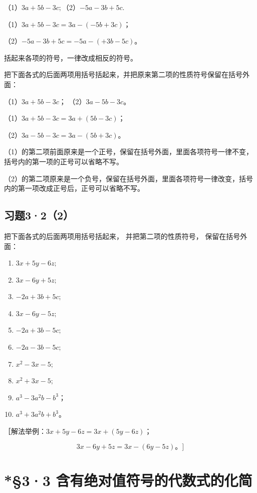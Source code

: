 （1）\(3a + 5b - 3c;\)（2）\(-5a - 3b + 5c.\)

 （1）\(3a + 5b - 3c = 3a - (-5b + 3c)\)；

（2）\(-5a - 3b + 5c = -5a - (+3b - 5c)\)。

 括起来各项的符号，一律改成相反的符号。

把下面各式的后面两项用括号括起来，并把原来第二项的性质符号保留在括号外面：

（1）\(3a + 5b - 3c\)； （2）\(3a - 5b - 3c\)。

 （1）\(3a + 5b - 3c = 3a + (5b - 3c)\)；

（2）\(3a - 5b - 3c = 3a - (5b + 3c)\)。

（1）的第二项前面原来是一个正号，保留在括号外面，里面各项符号一律不变，括号内的第一项的正号可以省略不写。

（2）的第二项原来是一个负号，保留在括号外面，里面各项符号一律改变，括号内的第一项改成正号后，正号可以省略不写。

\subsection{习题3·2（2）}

把下面各式的后面两项用括号括起来， 并把第二项的性质符号，
保留在括号外面：

\begin{enumerate}[start=1]
\item
  \(3x + 5y - 6z;\)
\item
  \(3x - 6y + 5z;\)
\item
  \(-2a + 3b + 5c;\)
\item
  \(3x - 6y - 5z;\)
\item
  \(-2a + 3b - 5c;\)
\item
  \(-2a - 3b - 5c;\)
\item
  \(x^{2} - 3x - 5;\)
\item
  \(x^{2} + 3x - 5;\)
\item
  \(a^3 - 3a^2b - b^3\)；
\item
  \(a^3 + 3a^2b + b^3\)。
\end{enumerate}

［解法举例：\(3x+5y-6z=3x+(5y-6z)\)；

\[
3 x - 6 y + 5 z = 3 x - (6 y - 5 z)\text{。} ]
\]

\section{*§3·3 含有绝对值符号的代数式的化简}

